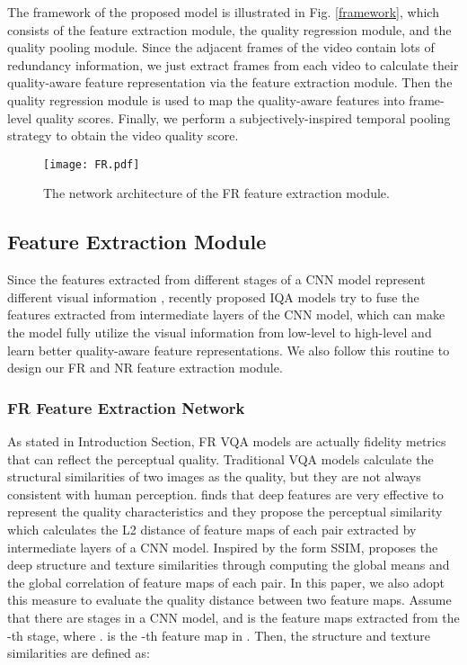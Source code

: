 \documentclass{article}
\begin{document}
The framework of the proposed model is illustrated in Fig. \ref{framework}, which consists of the feature extraction module, the quality regression module, and the quality pooling module. Since the adjacent frames of the video contain lots of redundancy information, we just extract  frames from each video to calculate their quality-aware feature representation via the feature extraction module. Then the quality regression module is used to map the quality-aware features into frame-level quality scores. Finally, we perform a subjectively-inspired temporal pooling strategy to obtain the video quality score.


\begin{figure}[!t]
	\centering
	\texttt{[image: FR.pdf]}
	\caption{The network architecture of the FR feature extraction module.}
	\label{FR}
	\vspace{-0.3cm}
\end{figure}

\subsection{Feature Extraction Module}
Since the features extracted from different stages of a CNN model represent different visual information \cite{zeiler2014visualizing}, recently proposed IQA models try to fuse the features extracted from intermediate layers of the CNN model, which can make the model fully utilize the visual information from low-level to high-level and learn better quality-aware feature representations. We also follow this routine to design our FR and NR feature extraction module.

\subsubsection{FR Feature Extraction Network}
As stated in Introduction Section, FR VQA models are actually fidelity metrics that can reflect the perceptual quality. Traditional VQA models calculate the structural similarities of two images as the quality, but they are not always consistent with human perception. \cite{zhang2018unreasonable} finds that deep features are very effective to represent the quality characteristics and they propose the perceptual similarity which calculates the L2 distance of feature maps of each pair extracted by intermediate layers of a CNN model. Inspired by the form SSIM, \cite{ding2020image} proposes the deep structure and texture similarities through computing the global means and the global correlation of feature maps of each pair. In this paper, we also adopt this measure to evaluate the quality distance between two feature maps.
Assume that there are  stages in a CNN model, and  is the feature maps extracted from the -th stage, where .  is the -th feature map in . Then, the structure and texture similarities are defined as:
\end{document}
